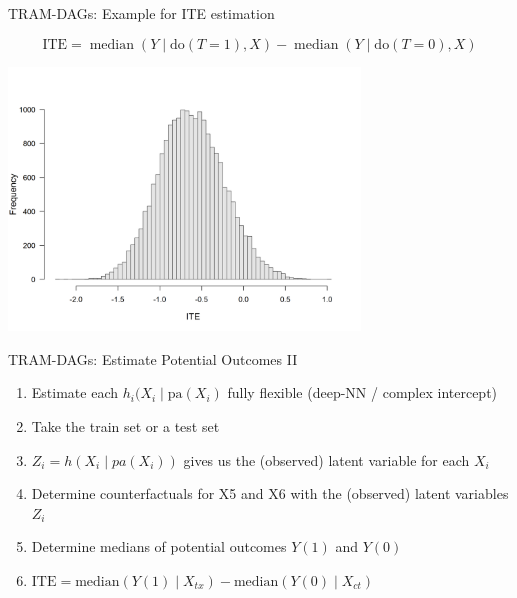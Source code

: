 \documentclass[onlytextwidth,english]{beamer}\usepackage[]{graphicx}\usepackage[]{xcolor}
\begin{document}
\begin{frame}{TRAM-DAGs: Example for ITE estimation}

\[
\text{ITE} = \operatorname{median}(Y \mid \text{do}(T = 1), X) - \operatorname{median}(Y \mid \text{do}(T = 0), X)
\]

\centering
\includegraphics[width=0.7\textwidth]{img/observ_scenario1_ite_distribution_dgp.png}

\end{frame}



\begin{frame}{TRAM-DAGs: Estimate Potential Outcomes II}


\begin{enumerate}
    \item Estimate each $h_i(X_i \mid \text{pa}(X_i)$ fully flexible (deep-NN / complex intercept)
    \item Take the train set or a test set
    \item $Z_i = h(X_i \mid pa(X_i))$ gives us the (observed) latent variable for each $X_i$
    \item Determine counterfactuals for X5 and X6 with the (observed) latent variables $Z_i$
    \item Determine medians of potential outcomes $Y(1)$ and $Y(0)$
    \item $\text{ITE} = \text{median}(Y(1) \mid X_{tx}) - \text{median}(Y(0) \mid X_{ct})$
\end{enumerate}

\end{frame}
\end{document}
